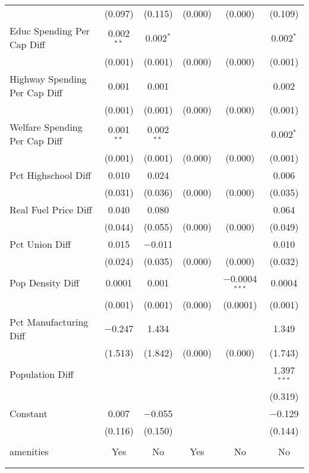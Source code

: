 \begin{table}[!htbp]
\begin{tabular}{@{\extracolsep{5pt}}lccccc}
  & (0.097) & (0.115) & (0.000) & (0.000) & (0.109) \\ 
  Educ Spending Per Cap Diff & 0.002$^{**}$ & 0.002$^{*}$ &  &  & 0.002$^{*}$ \\ 
  & (0.001) & (0.001) & (0.000) & (0.000) & (0.001) \\ 
  Highway Spending Per Cap Diff & 0.001 & 0.001 &  &  & 0.002 \\ 
  & (0.001) & (0.001) & (0.000) & (0.000) & (0.001) \\ 
  Welfare Spending Per Cap Diff & 0.001$^{**}$ & 0.002$^{**}$ &  &  & 0.002$^{*}$ \\ 
  & (0.001) & (0.001) & (0.000) & (0.000) & (0.001) \\ 
  Pct Highschool Diff & 0.010 & 0.024 &  &  & 0.006 \\ 
  & (0.031) & (0.036) & (0.000) & (0.000) & (0.035) \\ 
  Real Fuel Price Diff & 0.040 & 0.080 &  &  & 0.064 \\ 
  & (0.044) & (0.055) & (0.000) & (0.000) & (0.049) \\ 
  Pct Union Diff & 0.015 & $-$0.011 &  &  & 0.010 \\ 
  & (0.024) & (0.035) & (0.000) & (0.000) & (0.032) \\ 
  Pop Density Diff & 0.0001 & 0.001 &  & $-$0.0004$^{***}$ & 0.0004 \\ 
  & (0.001) & (0.001) & (0.000) & (0.0001) & (0.001) \\ 
  Pct Manufacturing Diff & $-$0.247 & 1.434 &  &  & 1.349 \\ 
  & (1.513) & (1.842) & (0.000) & (0.000) & (1.743) \\ 
  Population Diff &  &  &  &  & 1.397$^{***}$ \\ 
  &  &  &  &  & (0.319) \\ 
  Constant & 0.007 & $-$0.055 &  &  & $-$0.129 \\ 
  & (0.116) & (0.150) &  &  & (0.144) \\ 
 \hline \\[-1.8ex] 
amenities & Yes & No & Yes & No & No \\ 
\hline \\[-1.8ex] 
\hline 
\hline \\[-1.8ex] 
\end{tabular} 
\end{table} 
